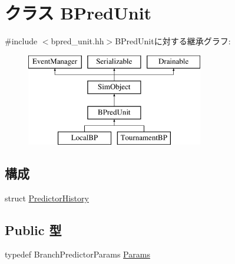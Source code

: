 \hypertarget{classBPredUnit}{
\section{クラス BPredUnit}
\label{classBPredUnit}
}


{\ttfamily \#include $<$bpred\_\-unit.hh$>$}BPredUnitに対する継承グラフ:\begin{figure}[H]
\begin{center}
\leavevmode
\includegraphics[height=4cm]{classBPredUnit}
\end{center}
\end{figure}
\subsection*{構成}
\begin{DoxyCompactItemize}
\item 
struct \hyperlink{structBPredUnit_1_1PredictorHistory}{PredictorHistory}
\end{DoxyCompactItemize}
\subsection*{Public 型}
\begin{DoxyCompactItemize}
\item 
typedef BranchPredictorParams \hyperlink{classBPredUnit_aa715df0f49f029439cca4c7bd6e3d4fb}{Params}
\end{DoxyCompactItemize}
